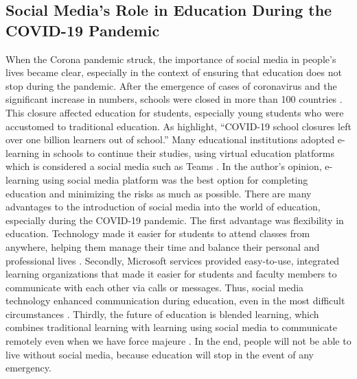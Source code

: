 \documentclass{article}
\begin{document}
\subsection{Social Media's Role in Education During the COVID-19 Pandemic}
When the Corona pandemic struck, the importance of social media in people's lives became clear, especially in the context of ensuring that education does not stop during the pandemic. After the emergence of cases of coronavirus and the significant increase in numbers, schools were closed in more than 100 countries \citep[cited in][]{onyema2020}. This closure affected education for students, especially young students who were accustomed to traditional education. As \citet[p.1]{onyema2020} highlight, ``COVID-19 school closures left over one billion learners out of school.'' Many educational institutions adopted e-learning in schools to continue their studies, using virtual education platforms which is considered a social media such as Teams \citep{onyema2020}. In the author's opinion, e-learning using social media platform was the best option for completing education and minimizing the risks as much as possible. There are many advantages to the introduction of social media into the world of education, especially during the COVID-19 pandemic. The first advantage was flexibility in education. Technology made it easier for students to attend classes from anywhere, helping them manage their time and balance their personal and professional lives \citep{moise2021}. Secondly, Microsoft services provided easy-to-use, integrated learning organizations that made it easier for students and faculty members to communicate with each other via calls or messages. Thus, social media technology enhanced communication during education, even in the most difficult circumstances \citep{moise2021}. Thirdly, the future of education is blended learning, which combines traditional learning with learning using social media to communicate remotely even when we have force majeure \citep{moise2021}. In the end, people will not be able to live without social media, because education will stop in the event of any emergency.
\newpage
\end{document}
